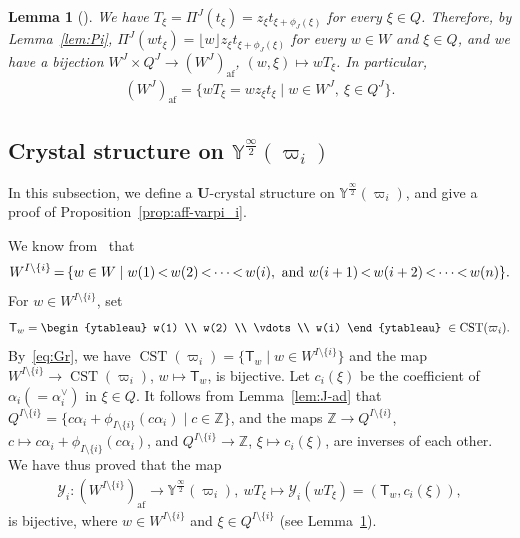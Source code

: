 \documentclass[10pt]{amsart}
\newtheorem{lemm}[theo]{Lemma}
\theoremstyle{definition}\newtheorem{defi}[theo]{Definition}
\theoremstyle{remark}\newtheorem{rema}[theo]{Remark}
\newcommand{\BZ}{\mathbb{Z}}
\newcommand{\U}{\mathbf{U}}
\newcommand{\si}{\frac{\infty}{2}}
\DeclareMathOperator{\af}{af}
\DeclareMathOperator{\CST}{CST}
\newcommand*{\Mk}{\mkern -2mu}
\begin{document}
\begin{lemm}[{\cite[Lemma~3.7]{LNSSS15}}] \label{lem:(W^J)_af}
We have 
$T_{\xi} = \Pi^J(t_{\xi}) = z_{\xi} t_{\xi + \phi_J(\xi)}$
for every $\xi \in Q$. 
Therefore, by Lemma~\ref{lem:Pi}, 
$\Pi^J(wt_{\xi}) = \lfloor w \rfloor z_{\xi} t_{\xi + \phi_J(\xi)}$
for every $w \in W$ and $\xi \in Q$, and we have a bijection
$W^J \times Q^J \rightarrow (W^J)_{\af}$, 
$(w,\xi) \mapsto wT_{\xi}$. 
In particular, 
\begin{align}
(W^J)_{\af} 
= 
\{ wT_{\xi} = w z_{\xi}t_{\xi} \mid w \in W^J , \ \xi \in Q^J \} .
\end{align}
\end{lemm}

\subsection{Crystal structure on \texorpdfstring{$\mathbb{Y}^{\si}(\varpi_i)$}{Y (infty/2)(varpi i)}} \label{Subsection:Y(pi_i)}

In this subsection, 
we define a $\U$-crystal structure on 
$\mathbb{Y}^{\si}(\varpi_i)$, 
and give a proof of Proposition~\ref{prop:aff-varpi_i}. 

We know from~\cite[Lemma~2.4.7]{BB}
that
\begin{align} \label{eq:Gr}
W^{I \setminus \{ i \}} 
\Mk = \Mk 
\{ w \in W \mid w(1) \Mk <\Mk w(2) \Mk < \Mk \cdots \Mk <\Mk w(i), \text{ and } w(i+1) \Mk <\Mk w(i+2) 
\Mk <\Mk \cdots \Mk < \Mk w(n) \} .
\end{align}
For 
$w \in W^{I \setminus \{ i \}}$, 
set
\begin{align}
\mathsf{T}_w = 
\begin{ytableau}
w(1) \\ w(2) \\ \vdots \\ w(i)
\end{ytableau}
\ \in 
\CST (\varpi_i) .
\end{align}
By~\eqref{eq:Gr}, 
we have 
$\CST (\varpi_i) = \{ \mathsf{T}_w \mid w \in W^{I \setminus \{ i \}} \}$ 
and the map
$W^{I \setminus \{ i \}} \rightarrow \CST (\varpi_i)$, $w \mapsto \mathsf{T}_w$, 
is bijective. 
Let 
$c_i(\xi)$ 
be the coefficient of $\alpha_i \left(= \alpha_i^{\vee}\right)$ in $\xi \in Q$. 
It follows from Lemma~\ref{lem:J-ad} that 
$Q^{I \setminus \{ i \}} = \{ c\alpha_i + \phi_{I\setminus \{ i \}}(c\alpha_i) \mid c \in \BZ \}$, 
and the maps 
$\BZ \rightarrow Q^{I \setminus \{ i \}}$, $c \mapsto c\alpha_i + \phi_{I\setminus \{ i \}}(c\alpha_i)$, 
and
$Q^{I \setminus \{ i \}} \rightarrow \BZ$, $\xi \mapsto c_i(\xi)$, 
are inverses of each other. 
We have thus proved that the map
\begin{align} \label{eq:W->Y}
\mathcal{Y}_i : 
(W^{I \setminus \{ i \}})_{\af} \rightarrow \mathbb{Y}^{\si}(\varpi_i),\ 
wT_{\xi} \mapsto 
\mathcal{Y}_i(wT_{\xi}) = 
\left( \mathsf{T}_w , c_i(\xi) \right),
\end{align}
is bijective, where 
$w \in W^{I \setminus \{ i \}}$
and 
$\xi \in Q^{I \setminus \{ i \}}$
(see Lemma~\ref{lem:(W^J)_af}).
\end{document}
